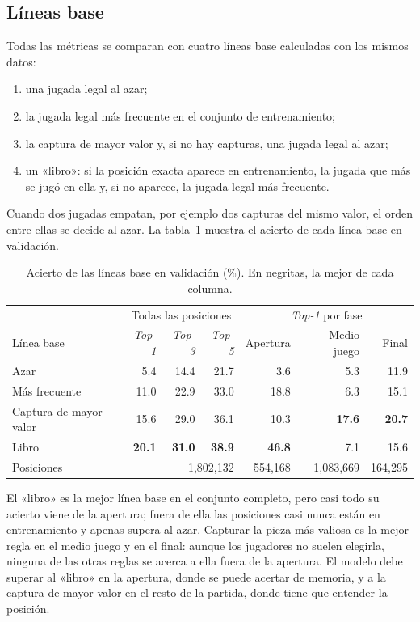 \documentclass[a4paper,12pt,twocolumn]{article}
\begin{document}
\subsection{Líneas base}
\label{sec:lineas-base}

Todas las métricas se comparan con cuatro líneas base calculadas con los mismos datos:
\begin{enumerate}[leftmargin=*]
	\item una jugada legal al azar;
	\item la jugada legal más frecuente en el conjunto de entrenamiento;
	\item la captura de mayor valor y, si no hay capturas, una jugada legal al azar;
	\item un «libro»: si la posición exacta aparece en entrenamiento, la jugada que más se jugó en ella y, si no aparece, la jugada legal más frecuente.
\end{enumerate}
Cuando dos jugadas empatan, por ejemplo dos capturas del mismo valor, el orden entre ellas se decide al azar. La tabla~\ref{tab:lineas-base} muestra el acierto de cada línea base en validación.

\begin{table}[t]
	\centering
	\footnotesize
	\setlength{\tabcolsep}{4pt}
	\begin{tabular}{lrrrrrr}
		\hline
		 & \multicolumn{3}{c}{Todas las posiciones} & \multicolumn{3}{c}{\textit{Top-1} por fase} \\
		Línea base & \textit{Top-1} & \textit{Top-3} & \textit{Top-5} & Apertura & Medio juego & Final \\
		\hline
		Azar & 5.4 & 14.4 & 21.7 & 3.6 & 5.3 & 11.9 \\
		Más frecuente & 11.0 & 22.9 & 33.0 & 18.8 & 6.3 & 15.1 \\
		Captura de mayor valor & 15.6 & 29.0 & 36.1 & 10.3 & \textbf{17.6} & \textbf{20.7} \\
		Libro & \textbf{20.1} & \textbf{31.0} & \textbf{38.9} & \textbf{46.8} & 7.1 & 15.6 \\
		\hline
		Posiciones & \multicolumn{3}{r}{1,802,132} & 554,168 & 1,083,669 & 164,295 \\
		\hline
	\end{tabular}
	\caption{Acierto de las líneas base en validación (\%). En negritas, la mejor de cada columna.}
	\label{tab:lineas-base}
\end{table}

El «libro» es la mejor línea base en el conjunto completo, pero casi todo su acierto viene de la apertura; fuera de ella las posiciones casi nunca están en entrenamiento y apenas supera al azar.
\newline
Capturar la pieza más valiosa es la mejor regla en el medio juego y en el final: aunque los jugadores no suelen elegirla, ninguna de las otras reglas se acerca a ella fuera de la apertura.
\newline
El modelo debe superar al «libro» en la apertura, donde se puede acertar de memoria, y a la captura de mayor valor en el resto de la partida, donde tiene que entender la posición.
\end{document}
